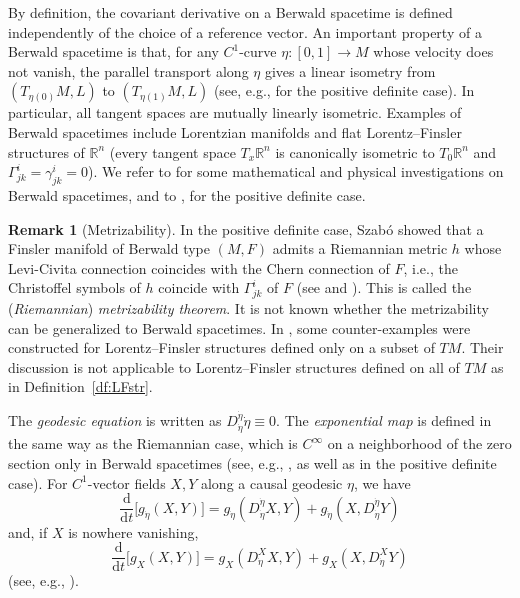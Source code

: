 \documentclass[a4paper,11pt]{article}
\numberwithin{equation}{section}
\theoremstyle{definition}
\newtheorem{remark}[definition]{Remark}
\theoremstyle{plain}
\newcommand{\lra}{\longrightarrow}
\newcommand{\dd}{\mathrm{d}}
\newcommand{\R}{\ensuremath{\mathbb{R}}}
\begin{document}
By definition, the covariant derivative on a Berwald spacetime is defined independently of the choice of a reference vector.
An important property of a Berwald spacetime is that, for any $C^1$-curve $\eta\colon [0,1] \lra M$ whose velocity does not vanish, the parallel transport along $\eta$ gives a linear isometry from $(T_{\eta(0)}M,L)$ to $(T_{\eta(1)}M,L)$ (see, e.g.,  \cite[Proposition~6.5]{Obook} for the positive definite case).
In particular, all tangent spaces are mutually linearly isometric.
Examples of Berwald spacetimes include Lorentzian manifolds
and flat Lorentz--Finsler structures of $\R^n$
(every tangent space $T_x\R^n$ is canonically isometric to $T_0\R^n$ and $\Gamma^i_{jk}=\gamma^i_{jk}=0$).
We refer to \cite{FP,GT,FPP,CapMas20,FHPV,HPV} for some mathematical and physical investigations on Berwald spacetimes,
and to \cite[Chapter~10]{BCS}, \cite[\S\S 6.3, 10.2]{Obook} for the positive definite case.

\begin{remark}[Metrizability]\label{rm:met}
In the positive definite case,
Szab\'o showed that a Finsler manifold of Berwald type $(M,F)$ admits a Riemannian metric $h$ whose Levi-Civita connection coincides with the Chern connection of $F$,
i.e., the Christoffel symbols of $h$ coincide with $\Gamma^i_{jk}$ of $F$
(see  \cite{Sz} and  \cite[Exercise~10.1.4]{BCS}).
This is called the (\emph{Riemannian}) \emph{metrizability theorem}.
It is not known whether the metrizability can be generalized to Berwald spacetimes.
In \cite{FHPV}, some counter-examples were constructed for Lorentz--Finsler structures defined only on a subset of $TM$.
Their discussion is not applicable to Lorentz--Finsler structures defined on all of $TM$ as in Definition~\ref{df:LFstr}.
\end{remark}

The \emph{geodesic equation} is written as $D^{\dot{\eta}}_{\dot{\eta}}\dot{\eta} \equiv 0$.
The \emph{exponential map} is defined in the same way as the Riemannian case,
which is $C^{\infty}$ on a neighborhood of the zero section only in Berwald spacetimes
(see, e.g., \cite{Min-coord}, as well as
\cite[Exercise~5.3.5]{BCS} in the positive definite case).
For $C^1$-vector fields $X,Y$ along a causal geodesic $\eta$, we have
\begin{equation}\label{eq:g_eta}
\frac{\dd}{\dd t}\bigl[ g_{\dot{\eta}}(X,Y) \bigr] =g_{\dot{\eta}}(D^{\dot{\eta}}_{\dot{\eta}}X,Y) +g_{\dot{\eta}}(X,D^{\dot{\eta}}_{\dot{\eta}}Y)
\end{equation}
and, if $X$ is nowhere vanishing,
\begin{equation}\label{eq:g_X}
\frac{\dd}{\dd t}\bigl[ g_X(X,Y) \bigr] =g_X(D^X_{\dot{\eta}}X,Y) +g_X(X,D^X_{\dot{\eta}}Y)
\end{equation}
(see, e.g.,  \cite[(3.1), (3.2)]{LMO1}).
\end{document}

